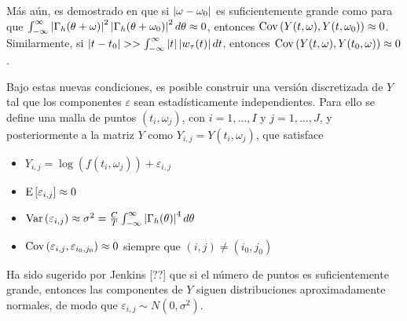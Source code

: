 Más aún, es demostrado en \cite{Priestley66} que si $\left| \omega-\omega_0 \right|$ es suficientemente 
grande como para que 
$\int_{-\infty}^{\infty} \left| \Gamma_h(\theta+\omega) \right|^{2}\left| \Gamma_h(\theta+\omega_0) \right|^{2} d\theta \approx 0$,
entonces 
%
$\mathrm{Cov}\left( Y(t,\omega),Y(t,\omega_0) \right) \approx 0$.
%
Similarmente, si $\left| t-t_0 \right| >> \int_{-\infty}^{\infty} \left| t \right| \left| w_\tau (t) \right| dt $, entonces
%
$\mathrm{Cov}\left( Y(t,\omega),Y(t_0,\omega) \right) \approx 0$.

Bajo estas nuevas condiciones, es posible construir una versión discretizada de $Y$ tal que los 
componentes $\varepsilon$ sean estadísticamente independientes. Para ello se define una malla de 
puntos $(t_i,\omega_j)$, con $i = 1,\dots,I$ y  $j=1,\dots,J$, y posteriormente a la matriz $Y$ 
como $Y_{i,j} = Y(t_i,\omega_j)$, que satisface
%
\begin{itemize}
\item $Y_{i,j} = \log\left(f(t_i,\omega_j)\right) + \varepsilon_{i,j}$
\item $\mathrm{E}\left[ \varepsilon_{i,j} \right] \approx 0$
\item $\mathrm{Var}\left( \varepsilon_{i,j} \right) \approx \sigma^{2} = 
\frac{C}{T} \int_{-\infty}^{\infty} \left| \Gamma_h(\theta) \right|^{4} d\theta$
\item $\mathrm{Cov}\left( \varepsilon_{i,j},\varepsilon_{i_0,j_0} \right) \approx 0$ siempre que $(i,j)\neq (i_0,j_0)$
\end{itemize}

Ha sido sugerido por Jenkins [??] que si el número de puntos es suficientemente grande, entonces
las componentes de $Y$ siguen distribuciones aproximadamente normales, de modo que
$\varepsilon_{i,j} \sim N(0,\sigma^{2})$.

